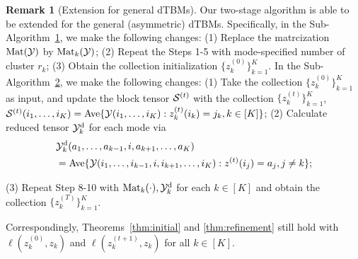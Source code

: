 \documentclass[lettersize,journal]{IEEEtran}
\theoremstyle{definition}
\theoremstyle{definition}
\newtheorem{rmk}{Remark}
\begin{document}
\begin{rmk}[Extension for general dTBMs]
Our two-stage algorithm is able to be extended for the general (asymmetric) dTBMs. Specifically, in the Sub-Algorithm~\hyperref[alg:main]{1}, we make the following changes: (1)
Replace the matrcization $\text{Mat}(\mathcal{Y})$ by $\text{Mat}_k(\mathcal{Y})$; (2) Repeat the Steps 1-5 with mode-specified number of cluster $r_k$; (3) Obtain the collection initialization $ \{z^{(0)}_k\}_{k=1}^K$. In the Sub-Algorithm~\hyperref[alg:main]{2}, we make the following changes: (1) Take the collection $\{z^{(0)}_k\}_{k=1}^K$ as input, and update the block tensor $\mathcal{S}^{(t)}$ with the collection $\{ z_k^{(t)}\}_{k=1}^K$, $
        \mathcal{S}^{(t)}(i_1,\ldots, i_K) =  \text{Ave} \{\mathcal{Y}(i_1,\ldots,i_K): z^{(t)}_k(i_k) = j_k, k \in [K]\}$;
(2) Calculate reduced tensor $\mathcal{Y}^{\text{d}}_k$ for each mode via
\begin{align}
    &\mathcal{Y}^{\text{d}}_k(a_1,\ldots,a_{k-1}, i ,a_{k+1},\ldots,a_K) \\
    &= \text{Ave}\{\mathcal{Y}(i_1,\ldots,i_{k-1},i,i_{k+1},\ldots,i_K): z^{(t)}(i_j) = a_j, j \neq k \}; 
\end{align}

(3) Repeat Step 8-10 with $\text{Mat}_k(\cdot), \mathcal{Y}_k^{\text{d}}$ for each $k \in [K]$ and obtain the collection $\{z^{(T)}_k\}_{k=1}^K$. 

Correspondingly, Theorems~\ref{thm:initial} and \ref{thm:refinement} still hold with $\ell(z^{(0)}_k, z_k)$ and $\ell(z^{(t+1)}_k, z_k)$  for all $k \in [K]$.

\end{rmk}
\end{document}
